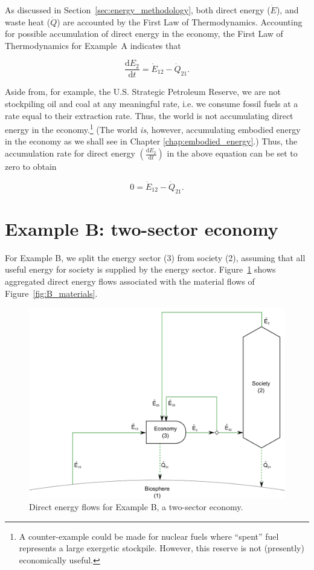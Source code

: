 As discussed in Section~\ref{sec:energy_methodology}, 
both direct energy ($\dot{E}$), and waste heat ($\dot{Q}$) 
are accounted by the First Law of Thermodynamics. 
Accounting for possible accumulation of direct energy in the economy, 
the First Law of Thermodynamics for Example~A indicates that

\begin{equation} \label{eq:dE_2/dt_single_sector}
	\frac{\mathrm{d}E_{2}}{\mathrm{d}t} = \dot{E}_{12} - \dot{Q}_{21}.
\end{equation}

Aside from, for example, the U.S. Strategic Petroleum Reserve, 
we are not stockpiling oil and coal at any meaningful rate, 
i.e. we consume fossil fuels at a rate equal to their extraction rate. 
Thus, the world is not accumulating direct energy 
in the economy.\footnote{A counter-example could be made 
for nuclear fuels where ``spent'' fuel represents a large exergetic stockpile. 
However, this reserve is not (presently) economically useful.} 
(The world \emph{is}, however, 
accumulating embodied energy in the economy as we shall see 
in Chapter \ref{chap:embodied_energy}.) 
Thus, the accumulation rate for direct energy 
$\left( \frac{\mathrm{d}E_{2}}{\mathrm{d}t} \right)$ in the above equation 
can be set to zero to obtain

\begin{equation} \label{eq:single_sector_direct_energy_no_accumulation}
	0 = \dot{E}_{12} - \dot{Q}_{21}.
\end{equation}


\section{Example B: two-sector economy}
\label{sec:B_energy}

For Example B, we split the energy sector (3) from 
society (2), assuming that all useful energy for society is 
supplied by the energy sector. Figure~\ref{fig:B_energy} shows aggregated
direct energy flows associated with the material flows of Figure~\ref{fig:B_materials}.

\begin{figure}[h!]
\centering
\includegraphics[width=0.8\linewidth]{Part_2/Chapter_Energy/images/2_sector_direct_energy.pdf}
\caption{Direct energy flows for Example B, a two-sector economy.}
\label{fig:B_energy}
\end{figure}

